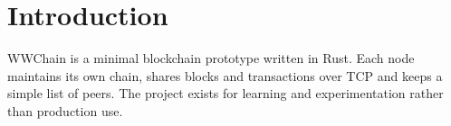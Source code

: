 \chapter{Introduction}
WWChain is a minimal blockchain prototype written in Rust. Each node maintains its own chain, shares blocks and transactions over TCP and keeps a simple list of peers. The project exists for learning and experimentation rather than production use.
